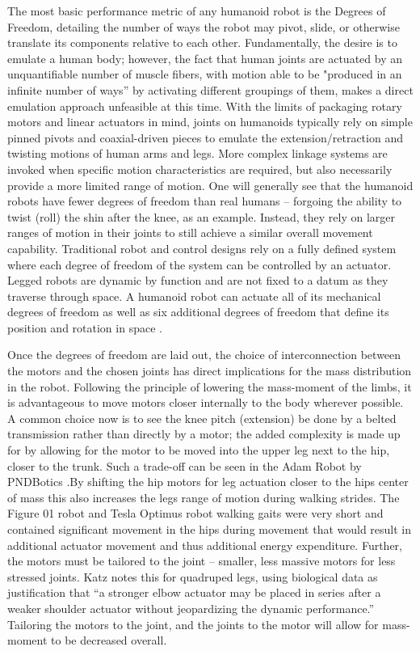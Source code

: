 \documentclass{article}
\begin{document}
The most basic performance metric of any humanoid robot is the Degrees of Freedom, detailing the number of ways the robot may pivot, slide, or otherwise translate its components relative to each other. Fundamentally, the desire is to emulate a human body; however, the fact that human joints are actuated by an unquantifiable number of muscle fibers, with motion able to be "produced in an infinite number of ways” \cite{mizrahi_mechanical_2015} %
by activating different groupings of them, makes a direct emulation approach unfeasible at this time. With the limits of packaging rotary motors and linear actuators in mind, joints on humanoids typically rely on simple pinned pivots and coaxial-driven pieces to emulate the extension/retraction and twisting motions of human arms and legs. More complex linkage systems are invoked when specific motion characteristics are required, but also necessarily provide a more limited range of motion. One will generally see that the humanoid robots have fewer degrees of freedom than real humans -- forgoing the ability to twist (roll) the shin after the knee, as an example. Instead, they rely on larger ranges of motion in their joints to still achieve a similar overall movement capability. Traditional robot and control designs rely on a fully defined system where each degree of freedom of the system can be controlled by an actuator. Legged robots are dynamic by function and are not fixed to a datum as they traverse through space. A humanoid robot can actuate all of its mechanical degrees of freedom as well as six additional degrees of freedom that define its position and rotation in space \cite{underactuatedruss}. 

Once the degrees of freedom are laid out, the choice of interconnection between the motors and the chosen joints has direct implications for the mass distribution in the robot. Following the principle of lowering the mass-moment of the limbs, it is advantageous to move motors closer internally to the body wherever possible. A common choice now is to see the knee pitch (extension) be done by a belted transmission rather than directly by a motor; the added complexity is made up for by allowing for the motor to be moved into the upper leg next to the hip, closer to the trunk. Such a trade-off can be seen in the Adam Robot by PNDBotics \cite{pndboticsAdam}.By shifting the hip motors for leg actuation closer to the hips center of mass this also increases the legs range of motion during walking strides. The Figure 01 robot and Tesla Optimus robot walking gaits were very short and contained significant movement in the hips during movement that would result in additional actuator movement and thus additional energy expenditure. Further, the motors must be tailored to the joint -- smaller, less massive motors for less stressed joints. Katz notes this for quadruped legs, using biological data as justification that “a stronger elbow actuator may be placed in series after a weaker shoulder actuator without jeopardizing the dynamic performance.” \cite{mckenzie_design_2012} %
Tailoring the motors to the joint, and the joints to the motor will allow for mass-moment to be decreased overall.
\end{document}
